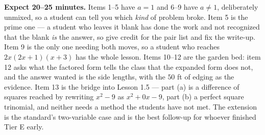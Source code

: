 \documentclass[10pt]{article}
\begin{document}
\begin{teachernote}[Homework]
    \textbf{Expect 20--25 minutes.} Items 1--5 have $a=1$ and 6--9 have $a \ne 1$, deliberately
    unmixed, so a student can tell you which \emph{kind} of problem broke. Item 5 is the prime one
    --- a student who leaves it blank has done the work and not recognized that the blank \emph{is}
    the answer, so give credit for the pair list and fix the write-up. Item 9 is the only one
    needing both moves, so a student who reaches $2x(2x+1)(x+3)$ has the whole lesson. Items 10--12
    are the garden bed: item 12 asks what the factored form tells the class that the expanded form
    does not, and the answer wanted is the side lengths, with the $50$ ft of edging as the evidence.
    Item 13 is the bridge into Lesson 1.5 --- part (a) is a difference of squares reached by
    rewriting $x^2-9$ as $x^2+0x-9$, part (b) a perfect square trinomial, and neither needs a method
    the students have not met. The extension is the standard's two-variable case and is the best
    follow-up for whoever finished Tier E early.
\end{teachernote}
\end{document}
